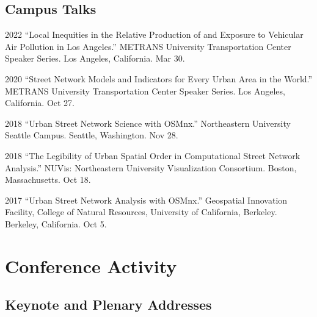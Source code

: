 \documentclass[12pt,letterpaper]{report}
\begin{document}
    \subsection*{Campus Talks}

    \begin{tablist}

        \item[2022] \tab{}\enquote{Local Inequities in the Relative Production of and Exposure to Vehicular Air Pollution in Los Angeles.} METRANS University Transportation Center Speaker Series. Los Angeles, California. Mar 30.

        \item[2020] \tab{}\enquote{Street Network Models and Indicators for Every Urban Area in the World.} METRANS University Transportation Center Speaker Series. Los Angeles, California. Oct 27.

        \item[2018] \tab{}\enquote{Urban Street Network Science with OSMnx.} Northeastern University Seattle Campus. Seattle, Washington. Nov 28.

        \item[2018] \tab{}\enquote{The Legibility of Urban Spatial Order in Computational Street Network Analysis.} NUVis: Northeastern University Visualization Consortium. Boston, Massachusetts. Oct 18.

        \item[2017] \tab{}\enquote{Urban Street Network Analysis with OSMnx.} Geospatial Innovation Facility, College of Natural Resources, University of California, Berkeley. Berkeley, California. Oct 5.

    \end{tablist}



    \section*{Conference Activity}

    \subsection*{Keynote and Plenary Addresses}
\end{document}
